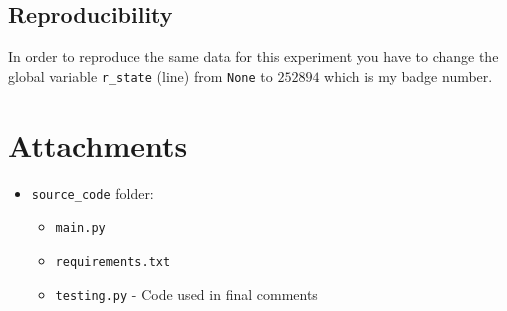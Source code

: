 \documentclass[a4paper, 11pt]{article}
\begin{document}
	\subsection{Reproducibility}
	In order to reproduce the same data for this experiment you have to change the global variable \texttt{r\_state} (line) from \texttt{None} to $252894$ which is my badge number.

	\section*{Attachments}
	\begin{itemize}
		\item \texttt{source\_code} folder:
		\begin{itemize}
			\item \texttt{main.py}
			\item \texttt{requirements.txt}
			\item \texttt{testing.py} - Code used in final comments
		\end{itemize}
	\end{itemize}
	
	
	
	
\end{document}
